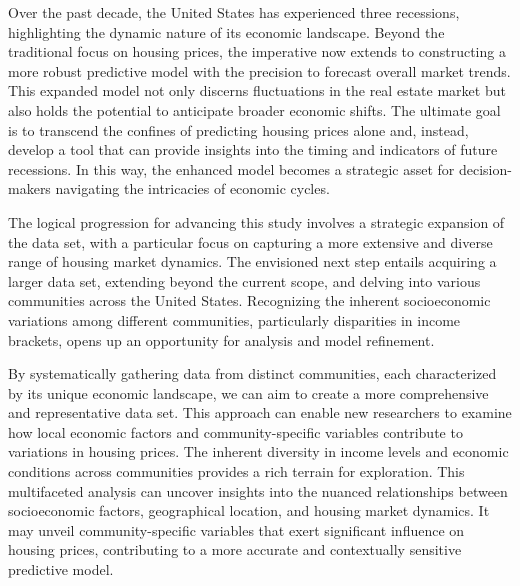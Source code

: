\documentclass[12pt]{article}
\begin{document}
Over the past decade, the United States has experienced three recessions, highlighting the dynamic nature of its economic landscape. Beyond the traditional focus on housing prices, the imperative now extends to constructing a more robust predictive model with the precision to forecast overall market trends. This expanded model not only discerns fluctuations in the real estate market but also holds the potential to anticipate broader economic shifts. The ultimate goal is to transcend the confines of predicting housing prices alone and, instead, develop a tool that can provide insights into the timing and indicators of future recessions. In this way, the enhanced model becomes a strategic asset for decision-makers navigating the intricacies of economic cycles.

The logical progression for advancing this study involves a strategic expansion of the data set, with a particular focus on capturing a more extensive and diverse range of housing market dynamics. The envisioned next step entails acquiring a larger data set, extending beyond the current scope, and delving into various communities across the United States. Recognizing the inherent socioeconomic variations among different communities, particularly disparities in income brackets, opens up an opportunity for analysis and model refinement.

By systematically gathering data from distinct communities, each characterized by its unique economic landscape, we can aim to create a more comprehensive and representative data set. This approach can enable new researchers to examine how local economic factors and community-specific variables contribute to variations in housing prices. The inherent diversity in income levels and economic conditions across communities provides a rich terrain for exploration. This multifaceted analysis can uncover insights into the nuanced relationships between socioeconomic factors, geographical location, and housing market dynamics. It may unveil community-specific variables that exert significant influence on housing prices, contributing to a more accurate and contextually sensitive predictive model.




\medskip

\printbibliography[title={References}]
\end{document}
